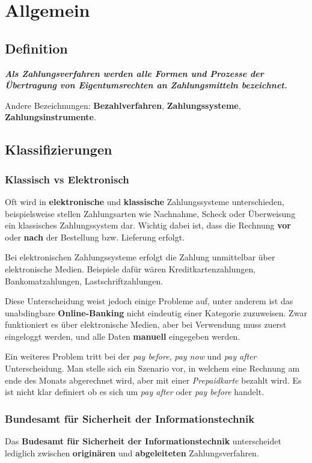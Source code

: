 \section{Allgemein}
\subsection{Definition}
\textit{\textbf{Als Zahlungsverfahren werden alle Formen und Prozesse der Übertragung von Eigentumsrechten an Zahlungsmitteln bezeichnet.}}

Andere Bezeichnungen: \textbf{Bezahlverfahren}, \textbf{Zahlungssysteme}, \textbf{Zahlungsinstrumente}.

\subsection{Klassifizierungen}
\subsubsection{Klassisch vs Elektronisch}
Oft wird in \textbf{elektronische} und \textbf{klassische} Zahlungssysteme unterschieden, beispielsweise stellen Zahlungsarten wie Nachnahme, Scheck oder Überweisung ein klassisches Zahlungssystem dar. Wichtig dabei ist, dass die Rechnung \textbf{vor} oder \textbf{nach} der Bestellung bzw. Lieferung erfolgt. 

Bei elektronischen Zahlungssysteme erfolgt die Zahlung unmittelbar über elektronische Medien. Beispiele dafür wären Kreditkartenzahlungen, Bankomatzahlungen, Lastschriftzahlungen. 

Diese Unterscheidung weist jedoch einige Probleme auf, unter anderem ist das unabdingbare \textbf{Online-Banking} nicht eindeutig einer Kategorie zuzuweisen. Zwar funktioniert es über elektronische Medien, aber bei Verwendung muss zuerst eingeloggt werden, und alle Daten \textbf{manuell} eingegeben werden. 

Ein weiteres Problem tritt bei der \textit{pay before}, \textit{pay now} und \textit{pay after} Unterscheidung. Man stelle sich ein Szenario vor, in welchem eine Rechnung am ende des Monats abgerechnet wird, aber mit einer \textit{Prepaidkarte} bezahlt wird. Es ist nicht klar definiert ob es sich um \textit{pay after} oder \textit{pay before} handelt.

\subsubsection{Bundesamt für Sicherheit der Informationstechnik}
Das \textbf{Budesamt für Sicherheit der Informationstechnik} unterscheidet lediglich zwischen \textbf{originären} und \textbf{abgeleiteten} Zahlungsverfahren.

